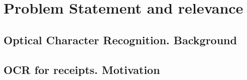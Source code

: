 \section{Problem Statement and relevance}
\subsection{Optical Character Recognition. Background}
\subsection{OCR for receipts. Motivation}